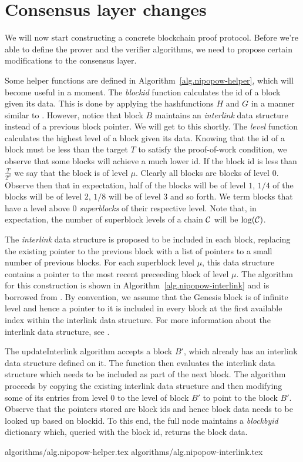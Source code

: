 \section{Consensus layer changes}

We will now start constructing a concrete blockchain proof protocol. Before
we're able to define the prover and the verifier algorithms, we need to propose
certain modifications to the consensus layer.

Some helper functions are defined in Algorithm~\ref{alg.nipopow-helper}, which
will become useful in a moment. The \textit{blockid} function calculates the
id of a block given its data. This is done by applying the hashfunctions $H$
and $G$ in a manner similar to \cite{backbone}. However, notice that block $B$
maintains an \textit{interlink} data structure instead of a previous block
pointer. We will get to this shortly. The \textit{level} function calculates
the highest level of a block given its data. Knowing that the id of a block
must be less than the target $T$ to satisfy the proof-of-work condition, we
observe that some blocks will achieve a much lower id. If the block id is less
than $\frac{T}{2^\mu}$ we say that the block is of level $\mu$. Clearly all
blocks are blocks of level $0$. Observe then that in expectation, half of the
blocks will be of level $1$, $1/4$ of the blocks will be of level $2$, $1/8$
will be of level $3$ and so forth. We term blocks that have a level above 0
\textit{superblocks} of their respective level. Note that, in expectation, the
number of superblock levels of a chain $\mathcal{C}$ will be $\log(\mathcal{C})$.

The \textit{interlink} data structure is proposed to be included in each block,
replacing the existing pointer to the previous block with a list of pointers to
a small number of previous blocks. For each superblock level $\mu$, this data
structure contains a pointer to the most recent preceeding block of level
$\mu$. The algorithm for this construction is shown in
Algorithm~\ref{alg.nipopow-interlink} and is borrowed from \cite{KLS}. By
convention, we assume that the Genesis block is of infinite level and hence a
pointer to it is included in every block at the first available index within
the interlink data structure. For more information about the interlink data
structure, see \cite{KLS}.

The updateInterlink algorithm accepts a block $B'$, which already has an
interlink data structure defined on it. The function then evaluates the
interlink data structure which needs to be included as part of the next block.
The algorithm proceeds by copying the existing interlink data structure and
then modifying some of its entries from level $0$ to the level of block $B'$ to
point to the block $B'$. Observe that the pointers stored are block ids and
hence block data needs to be looked up based on blockid. To this end, the full
node maintains a \textit{blockbyid} dictionary which, queried with the block
id, returns the block data.

{algorithms/alg.nipopow-helper.tex}
{algorithms/alg.nipopow-interlink.tex}
